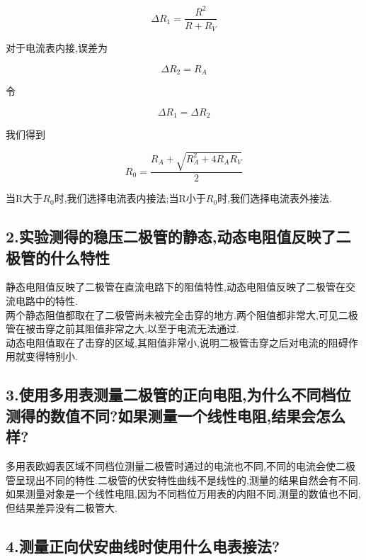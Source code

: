 \documentclass[a4paper,10pt,notitlepage]{report}
\begin{document}
\begin{equation}
	\Delta R_1 = \frac{R^2}{R + R_V}
\end{equation}

	对于电流表内接,误差为
	
\begin{equation}
	\Delta R_2 = R_A
\end{equation}

	令
	
\begin{equation}
	\Delta R_1 = \Delta R_2
\end{equation}
	
	我们得到
	
\begin{equation}
	R_0 = \frac{R_A+\sqrt{R_A^2 + 4R_AR_V}}{2}
\end{equation}

	当R大于$R_0$时,我们选择电流表内接法;当R小于$R_0$时,我们选择电流表外接法.

\subsection*{2.实验测得的稳压二极管的静态,动态电阻值反映了二极管的什么特性}

	静态电阻值反映了二极管在直流电路下的阻值特性,动态电阻值反映了二极管在交流电路中的特性. \\
	
	两个静态阻值都取在了二极管尚未被完全击穿的地方.两个阻值都非常大,可见二极管在被击穿之前其阻值非常之大,以至于电流无法通过. \\
	
	动态电阻值取在了击穿的区域,其阻值非常小,说明二极管击穿之后对电流的阻碍作用就变得特别小. \\
	
\subsection*{3.使用多用表测量二极管的正向电阻,为什么不同档位测得的数值不同?如果测量一个线性电阻,结果会怎么样?}

	多用表欧姆表区域不同档位测量二极管时通过的电流也不同,不同的电流会使二极管呈现出不同的特性.二极管的伏安特性曲线不是线性的,测量的结果自然会有不同. \\
	
	如果测量对象是一个线性电阻,因为不同档位万用表的内阻不同,测量的数值也不同,但结果差异没有二极管大. \\
	
\subsection*{4.测量正向伏安曲线时使用什么电表接法?}
\end{document}
